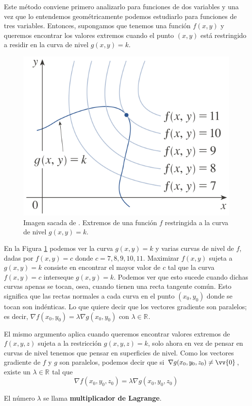 \documentclass[12pt]{article}
\begin{document}
Este método conviene primero analizarlo para funciones de dos variables y una vez que lo entendemos geométricamente podemos estudiarlo para funciones de tres variables. Entonces, supongamos que tenemos una función $ f(x,y) $ y queremos encontrar los valores extremos cuando el punto $ (x,y) $ está restringido a residir en la curva de nivel $ g(x,y)=k $. 

\begin{figure}[H]
  \centering
  \includegraphics[width=0.4\linewidth]{imagenes/lagrange_2_variables.png}
  \caption{Imagen sacada de \parencite{stewart2}. Extremos de una función $ f $ restringida a la curva de nivel $ g(x,y)=k $.}
  \label{fig:lagrange}
\end{figure}

En la Figura \ref{fig:lagrange} podemos ver la curva $ g(x,y)=k $ y varias curvas de nivel de $ f $, dadas por $ f(x,y)=c $ donde $ c= 7,8,9,10,11 $. Maximizar $ f(x,y) $ sujeta a $ g(x,y)=k $ consiste en encontrar el mayor valor de $ c $ tal que la curva $ f(x,y)=c $ interseque $ g(x,y)=k $. Podemos ver que esto sucede cuando dichas curvas apenas se tocan, osea, cuando tienen una recta tangente común. Esto significa que las rectas normales a cada curva en el punto $ (x_{0},y_{0}) $ donde se tocan son indénticas. Lo que quiere decir que los vectores gradiente son paralelos; es decir, $ \nabla f(x_{0},y_{0}) = \lambda \nabla g(x_{0},y_{0}) $ con $ \lambda  \in \mathbb{R}^{} $.

El mismo argumento aplica cuando queremos encontrar valores extremos de $ f(x,y,z) $ sujeta a la restricción $ g(x,y,z)=k $, solo ahora en vez de pensar en curvas de nivel tenemos que pensar en superficies de nivel. Como los vectores gradiente de $ f $ y $ g $ son paralelos, podemos decir que si $ \nabla g(x_{0},y_{0},z_{0})\neq \vv{0} $, existe un $ \lambda  \in \mathbb{R}^{} $ tal que
\[
  \nabla f(x_{0},y_{0},z_{0}) = \lambda \nabla g(x_{0},y_{0},z_{0})
\]

El número $ \lambda $ se llama \textbf{multiplicador de Lagrange}.
\end{document}
